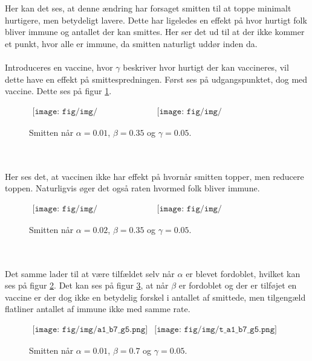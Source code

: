 %
Her kan det ses, at denne ændring har forsaget smitten til at toppe minimalt hurtigere, men betydeligt lavere.
Dette har ligeledes en effekt på hvor hurtigt folk bliver immune og antallet der kan smittes.
Her ser det ud til at der ikke kommer et punkt, hvor alle er immune, da smitten naturligt uddør inden da.\\\\
%
Introduceres en vaccine, hvor $\gamma$ beskriver hvor hurtigt der kan vaccineres, vil dette have en effekt på smittespredningen.
Først ses på udgangspunktet, dog med vaccine.
Dette ses på figur \ref{fig:a1_b35_g5}.
%
\begin{figure}[!ht]
\centering
$
\begin{matrix}
\texttt{[image: fig/img/a1\_b35\_g5.png]}&
\texttt{[image: fig/img/t\_a1\_b35\_g5.png]}
\end{matrix}
$
\caption{Smitten når $\alpha = 0.01$, $\beta = 0.35$ og $\gamma = 0.05$.}
\label{fig:a1_b35_g5}
\end{figure}\\\\
%
Her ses det, at vaccinen ikke har effekt på hvornår smitten topper, men reducere toppen.
Naturligvis øger det også raten hvormed folk bliver immune.
%
\begin{figure}[!ht]
\centering
$
\begin{matrix}
\texttt{[image: fig/img/a2\_b35\_g5.png]}&
\texttt{[image: fig/img/t\_a2\_b35\_g5.png]}
\end{matrix}
$
\caption{Smitten når $\alpha = 0.02$, $\beta = 0.35$ og $\gamma = 0.05$.}
\label{fig:a2_b35_g5}
\end{figure}\\\\
%
Det samme lader til at være tilfældet selv når $\alpha$ er blevet fordoblet, hvilket kan ses på figur \ref{fig:a2_b35_g5}.
Det kan ses på figur \ref{fig:a1_b7_g5}, at når $\beta$ er fordoblet og der er tilføjet en vaccine er der dog ikke en betydelig forskel i antallet af smittede, men tilgengæld flatliner antallet af immune ikke med samme rate.
%
\begin{figure}[!ht]
\centering
$
\begin{matrix}
\texttt{[image: fig/img/a1\_b7\_g5.png]}&
\texttt{[image: fig/img/t\_a1\_b7\_g5.png]}
\end{matrix}
$
\caption{Smitten når $\alpha = 0.01$, $\beta = 0.7$ og $\gamma = 0.05$.}
\label{fig:a1_b7_g5}
\end{figure}\\\\
